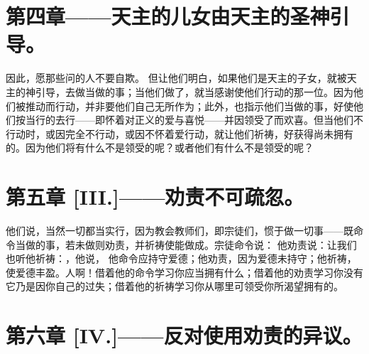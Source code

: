 
\section{第四章——天主的儿女由天主的圣神引导。}

因此，愿那些问的人不要自欺。 但让他们明白，如果他们是天主的子女，就被天主的神引导，去做当做的事；当他们做了，就当感谢使他们行动的那一位。因为他们被推动而行动，并非要他们自己无所作为；此外，也指示他们当做的事，好使他们按当行的去行——即怀着对正义的爱与喜悦——并因领受了而欢喜。但当他们不行动时，或因完全不行动，或因不怀着爱行动，就让他们祈祷，好获得尚未拥有的。因为他们将有什么不是领受的呢？或者他们有什么不是领受的呢？\par


\section{第五章 [III.]——劝责不可疏忽。}

他们说，当然一切都当实行，因为教会教师们，即宗徒们，惯于做一切事——既命令当做的事，若未做则劝责，并祈祷使能做成。宗徒命令说： 他劝责说：让我们也听他祈祷：，他说， 他命令应持守爱德；他劝责，因为爱德未持守；他祈祷，使爱德丰盈。人啊！借着他的命令学习你应当拥有什么；借着他的劝责学习你没有它乃是因你自己的过失；借着他的祈祷学习你从哪里可领受你所渴望拥有的。\par


\section{第六章 [IV.]——反对使用劝责的异议。}

